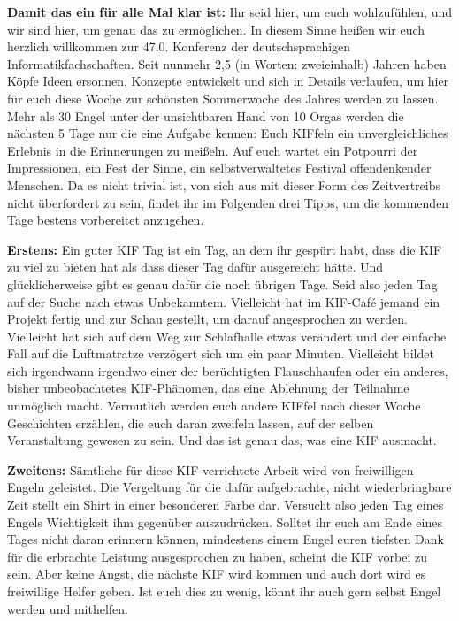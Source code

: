 
\textbf{Damit das ein für alle Mal klar ist:} Ihr seid hier, um euch wohlzufühlen, und wir sind hier, um genau das zu ermöglichen.
In diesem Sinne heißen wir euch herzlich willkommen zur 47.0. Konferenz der deutschsprachigen Informatikfachschaften.
Seit nunmehr 2,5 (in Worten: zweieinhalb) Jahren haben Köpfe Ideen ersonnen, Konzepte entwickelt und sich in Details verlaufen, um hier für euch diese Woche zur schönsten Sommerwoche des Jahres werden zu lassen.
Mehr als 30 Engel unter der unsichtbaren Hand von 10 Orgas werden die nächsten 5 Tage nur die eine Aufgabe kennen: Euch KIFfeln ein unvergleichliches Erlebnis in die Erinnerungen zu meißeln.
Auf euch wartet ein Potpourri der Impressionen, ein Fest der Sinne, ein selbstverwaltetes Festival offendenkender Menschen.
Da es nicht trivial ist, von sich aus mit dieser Form des Zeitvertreibs nicht überfordert zu sein, findet ihr im Folgenden drei Tipps, um die kommenden Tage bestens vorbereitet anzugehen.

\textbf{Erstens:}
Ein guter KIF Tag ist ein Tag, an dem ihr gespürt habt, dass die KIF zu viel zu bieten hat als dass dieser Tag dafür ausgereicht hätte.
Und glücklicherweise gibt es genau dafür die noch übrigen Tage.
Seid also jeden Tag auf der Suche nach etwas Unbekanntem.
Vielleicht hat im KIF-Café jemand ein Projekt fertig und zur Schau gestellt, um darauf angesprochen zu werden.
Vielleicht hat sich auf dem Weg zur Schlafhalle etwas verändert und der einfache Fall auf die Luftmatratze verzögert sich um ein paar Minuten.
Vielleicht bildet sich irgendwann irgendwo einer der berüchtigten Flauschhaufen oder ein anderes, bisher unbeobachtetes KIF-Phänomen, das eine Ablehnung der Teilnahme unmöglich macht.
Vermutlich werden euch andere KIFfel nach dieser Woche Geschichten erzählen, die euch daran zweifeln lassen, auf der selben Veranstaltung gewesen zu sein.
Und das ist genau das, was eine KIF ausmacht.

\textbf{Zweitens:}
Sämtliche für diese KIF verrichtete Arbeit wird von freiwilligen Engeln geleistet.
Die Vergeltung für die dafür aufgebrachte, nicht wiederbringbare Zeit stellt ein Shirt in einer besonderen Farbe dar.
Versucht also jeden Tag eines Engels Wichtigkeit ihm gegenüber auszudrücken.
Solltet ihr euch am Ende eines Tages nicht daran erinnern können, mindestens einem Engel euren tiefsten Dank für die erbrachte Leistung ausgesprochen zu haben, scheint die KIF vorbei zu sein.
Aber keine Angst, die nächste KIF wird kommen und auch dort wird es freiwillige Helfer geben.
Ist euch dies zu wenig, könnt ihr auch gern selbst Engel werden und mithelfen.


